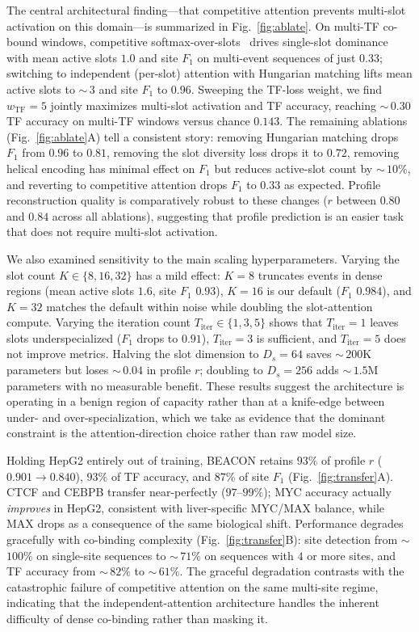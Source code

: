 \documentclass{article}
\begin{document}
The central architectural finding---that competitive attention prevents multi-slot activation on this domain---is summarized in Fig.~\ref{fig:ablate}. On multi-TF co-bound windows, competitive softmax-over-slots~\citep{locatello2020slotattention} drives single-slot dominance with mean active slots $1.0$ and site $F_1$ on multi-event sequences of just $0.33$; switching to independent (per-slot) attention with Hungarian matching lifts mean active slots to $\sim$\,$3$ and site $F_1$ to $0.96$. Sweeping the TF-loss weight, we find $w_{\text{TF}}{=}5$ jointly maximizes multi-slot activation and TF accuracy, reaching $\sim$\,$0.30$ TF accuracy on multi-TF windows versus chance $0.143$. The remaining ablations (Fig.~\ref{fig:ablate}A) tell a consistent story: removing Hungarian matching drops $F_1$ from $0.96$ to $0.81$, removing the slot diversity loss drops it to $0.72$, removing helical encoding has minimal effect on $F_1$ but reduces active-slot count by $\sim$\,$10\%$, and reverting to competitive attention drops $F_1$ to $0.33$ as expected. Profile reconstruction quality is comparatively robust to these changes ($r$ between $0.80$ and $0.84$ across all ablations), suggesting that profile prediction is an easier task that does not require multi-slot activation.

We also examined sensitivity to the main scaling hyperparameters. Varying the slot count $K\in\{8,16,32\}$ has a mild effect: $K{=}8$ truncates events in dense regions (mean active slots $1.6$, site $F_1$ $0.93$), $K{=}16$ is our default ($F_1$ $0.984$), and $K{=}32$ matches the default within noise while doubling the slot-attention compute. Varying the iteration count $T_{\text{iter}}\in\{1,3,5\}$ shows that $T_{\text{iter}}{=}1$ leaves slots underspecialized ($F_1$ drops to $0.91$), $T_{\text{iter}}{=}3$ is sufficient, and $T_{\text{iter}}{=}5$ does not improve metrics. Halving the slot dimension to $D_s{=}64$ saves $\sim$\,$200$K parameters but loses $\sim$\,$0.04$ in profile $r$; doubling to $D_s{=}256$ adds $\sim$\,$1.5$M parameters with no measurable benefit. These results suggest the architecture is operating in a benign region of capacity rather than at a knife-edge between under- and over-specialization, which we take as evidence that the dominant constraint is the attention-direction choice rather than raw model size.

Holding HepG2 entirely out of training, BEACON retains $93\%$ of profile $r$ ($0.901\!\to\!0.840$), $93\%$ of TF accuracy, and $87\%$ of site $F_1$ (Fig.~\ref{fig:transfer}A). CTCF and CEBPB transfer near-perfectly ($97$--$99\%$); MYC accuracy actually \emph{improves} in HepG2, consistent with liver-specific MYC/MAX balance, while MAX drops as a consequence of the same biological shift. Performance degrades gracefully with co-binding complexity (Fig.~\ref{fig:transfer}B): site detection from $\sim$\,$100\%$ on single-site sequences to $\sim$\,$71\%$ on sequences with $4$ or more sites, and TF accuracy from $\sim$\,$82\%$ to $\sim$\,$61\%$. The graceful degradation contrasts with the catastrophic failure of competitive attention on the same multi-site regime, indicating that the independent-attention architecture handles the inherent difficulty of dense co-binding rather than masking it.
\end{document}
